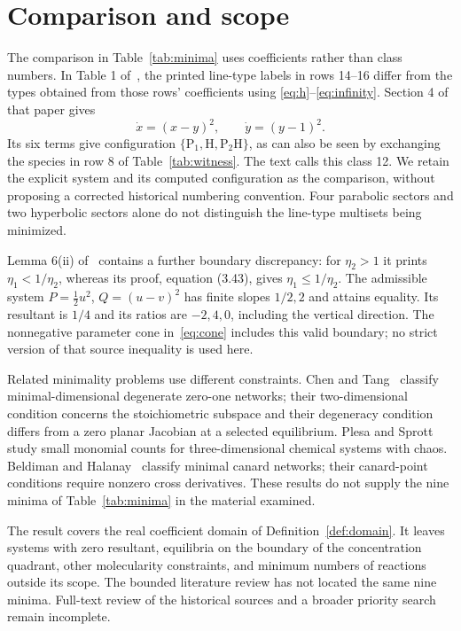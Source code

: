 \documentclass[11pt,a4paper]{article}
\theoremstyle{definition}\newtheorem{definition}[theorem]{Definition}
\newcommand{\HH}{\mathrm H}
\newcommand{\PP}{\mathrm P}
\begin{document}
\section{Comparison and scope}
The comparison in Table~\ref{tab:minima} uses coefficients rather than class
numbers. In Table 1 of~\cite{YE}, the printed line-type labels in rows
14--16 differ from the types obtained from those rows' coefficients using
\eqref{eq:h}--\eqref{eq:infinity}. Section 4 of that paper gives
\[
 \dot x=(x-y)^2,\qquad \dot y=(y-1)^2.
\]
Its six terms give configuration $\{\PP_1,\HH,\PP_2\HH\}$, as can also
be seen by exchanging the species in row 8 of Table~\ref{tab:witness}.
The text calls this class 12. We retain the explicit system and its
computed configuration as the comparison, without proposing a corrected
historical numbering convention. Four parabolic sectors and two hyperbolic
sectors alone do not distinguish the line-type multisets being minimized.

Lemma 6(ii) of~\cite{YE} contains a further boundary discrepancy: for
$\eta_2>1$ it prints $\eta_1<1/\eta_2$, whereas its proof, equation (3.43),
gives $\eta_1\leq1/\eta_2$. The admissible system
$P=\tfrac12u^2$, $Q=(u-v)^2$ has finite slopes $1/2,2$ and attains equality.
Its resultant is $1/4$ and its ratios are $-2,4,0$, including the vertical
direction. The nonnegative parameter cone in~\eqref{eq:cone} includes this
valid boundary; no strict version of that source inequality is used here.

Related minimality problems use different constraints. Chen and
Tang~\cite{CT} classify minimal-dimensional degenerate zero-one networks;
their two-dimensional condition concerns the stoichiometric subspace and
their degeneracy condition differs from a zero planar Jacobian at a
selected equilibrium. Plesa and Sprott~\cite{PS} study small monomial
counts for three-dimensional chemical systems with chaos. Beldiman and
Halanay~\cite{BH} classify minimal canard networks; their canard-point
conditions require nonzero cross derivatives. These results do not supply
the nine minima of Table~\ref{tab:minima} in the material examined.

The result covers the real coefficient domain of Definition~\ref{def:domain}.
It leaves systems with zero resultant, equilibria on the boundary of the
concentration quadrant, other molecularity constraints, and minimum numbers
of reactions outside its scope. The bounded literature review has not
located the same nine minima. Full-text review of the historical sources
and a broader priority search remain incomplete.
\end{document}
